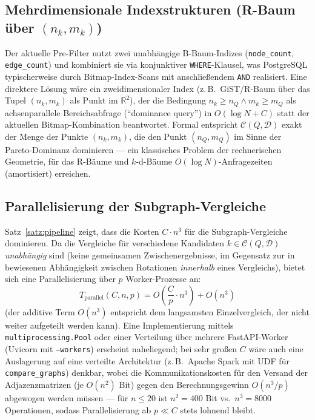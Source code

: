 \documentclass[a4paper,12pt]{article}
\theoremstyle{definition}
\begin{document}
\subsection{Mehrdimensionale Indexstrukturen (R-Baum über $(n_k,m_k)$)}

Der aktuelle Pre-Filter nutzt zwei unabhängige B-Baum-Indizes (\texttt{node\_count}, \texttt{edge\_count}) und kombiniert sie via konjunktiver \texttt{WHERE}-Klausel, was PostgreSQL typischerweise durch Bitmap-Index-Scans mit anschließendem \texttt{AND} realisiert. Eine direktere Lösung wäre ein zweidimensionaler Index (z.\,B.\ GiST/R-Baum über das Tupel $(n_k,m_k)$ als Punkt im $\mathbb{R}^2$), der die Bedingung $n_k \ge n_Q \wedge m_k \ge m_Q$ als achsenparallele Bereichsabfrage (``dominance query'') in $O(\log N + C)$ statt der aktuellen Bitmap-Kombination beantwortet. Formal entspricht $\mathcal{C}(Q,\mathcal{D})$ exakt der Menge der Punkte $(n_k,m_k)$, die den Punkt $(n_Q,m_Q)$ im Sinne der Pareto-Dominanz dominieren — ein klassisches Problem der rechnerischen Geometrie, für das R-Bäume und $k$-d-Bäume $O(\log N)$-Anfragezeiten (amortisiert) erreichen.

\subsection{Parallelisierung der Subgraph-Vergleiche}

Satz~\ref{satz:pipeline} zeigt, dass die Kosten $C \cdot n^3$ für die Subgraph-Vergleiche dominieren. Da die Vergleiche für verschiedene Kandidaten $k \in \mathcal{C}(Q,\mathcal{D})$ \emph{unabhängig} sind (keine gemeinsamen Zwischenergebnisse, im Gegensatz zur in \cite{epp2026subgraph} bewiesenen Abhängigkeit zwischen Rotationen \emph{innerhalb} eines Vergleichs), bietet sich eine Parallelisierung über $p$ Worker-Prozesse an:
\[
T_{\text{parallel}}(C,n,p) = O\left(\frac{C}{p}\cdot n^3\right) + O(n^3)
\]
(der additive Term $O(n^3)$ entspricht dem langsamsten Einzelvergleich, der nicht weiter aufgeteilt werden kann). Eine Implementierung mittels \texttt{multiprocessing.Pool} oder einer Verteilung über mehrere FastAPI-Worker (Uvicorn mit \texttt{--workers}) erscheint naheliegend; bei sehr großen $C$ wäre auch eine Auslagerung auf eine verteilte Architektur (z.\,B.\ Apache Spark mit UDF für \texttt{compare\_graphs}) denkbar, wobei die Kommunikationskosten für den Versand der Adjazenzmatrizen (je $O(n^2)$ Bit) gegen den Berechnungsgewinn $O(n^3/p)$ abgewogen werden müssen — für $n \le 20$ ist $n^2=400$ Bit vs.\ $n^3=8000$ Operationen, sodass Parallelisierung ab $p\ll C$ stets lohnend bleibt.
\end{document}
